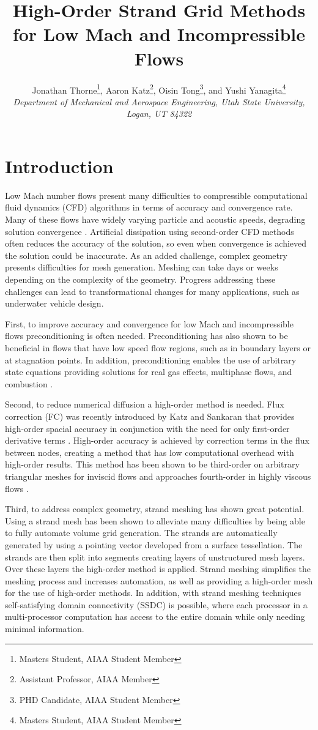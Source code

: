 \documentclass[draft]{aiaa-pretty}
\author{ %
Jonathan Thorne\thanks{Masters Student, AIAA Student Member}, 
Aaron Katz\thanks{Assistant Professor, AIAA Member}, 
Oisin Tong\thanks{PHD Candidate, AIAA Student Member},
and Yushi Yanagita\thanks{Masters Student, AIAA Student Member}\\
\textit{Department of Mechanical and Aerospace Engineering, Utah State University, Logan, UT 84322}}
\title{High-Order Strand Grid Methods for Low Mach and Incompressible Flows}
\begin{document}
\maketitle

\section{Introduction}
Low Mach number flows present many difficulties to compressible computational fluid dynamics (CFD) algorithms in terms of accuracy and convergence rate.  
Many of these flows have widely varying particle and acoustic speeds, degrading solution convergence \cite{Folkner2014}.  Artificial dissipation
using second-order CFD methods often reduces the accuracy of the solution, so even when convergence is achieved the solution could be
inaccurate.  As an added challenge, complex geometry presents difficulties for mesh generation.  Meshing can take days or weeks
depending on the complexity of the geometry.  Progress addressing these challenges can lead to transformational changes for many applications, such as underwater vehicle design.

First, to improve accuracy and convergence for low Mach and incompressible flows preconditioning is often needed.  Preconditioning has also shown to be beneficial in flows that 
have low speed flow regions, such as in boundary layers or at stagnation points. In addition, preconditioning enables the use of arbitrary state equations providing 
solutions for real gas effects, multiphase flows, and combustion \cite{Merkle1998}.

Second, to reduce numerical diffusion a high-order method is needed.  Flux correction (FC) was recently introduced by Katz and Sankaran \cite{Katz2012} that provides high-order 
spacial accuracy in conjunction with the need for only first-order derivative terms \cite{Katz2013,Delanaye1999}.  High-order accuracy is achieved by correction terms in the flux 
between nodes, creating a method that has low computational overhead with high-order results.  This method has been shown to be third-order on arbitrary triangular meshes for 
inviscid flows \cite{Katz2012} and approaches fourth-order in highly viscous flows \cite{Katz2013}.

Third, to address complex geometry, strand meshing has shown great potential.  Using a strand mesh has been shown to alleviate many difficulties by being
able to fully automate volume grid generation.  The strands are automatically generated by using a pointing vector developed from a surface tessellation.  The strands are 
then split into segments creating layers of unstructured mesh layers.  Over these layers the high-order method is applied.  Strand meshing simplifies the
meshing process and increases automation, as well as providing a high-order mesh for the use of high-order methods.  In addition, with strand meshing techniques 
self-satisfying domain connectivity (SSDC) is possible, where each processor in a multi-processor computation has access to the entire domain while only needing 
minimal information.
\end{document}
